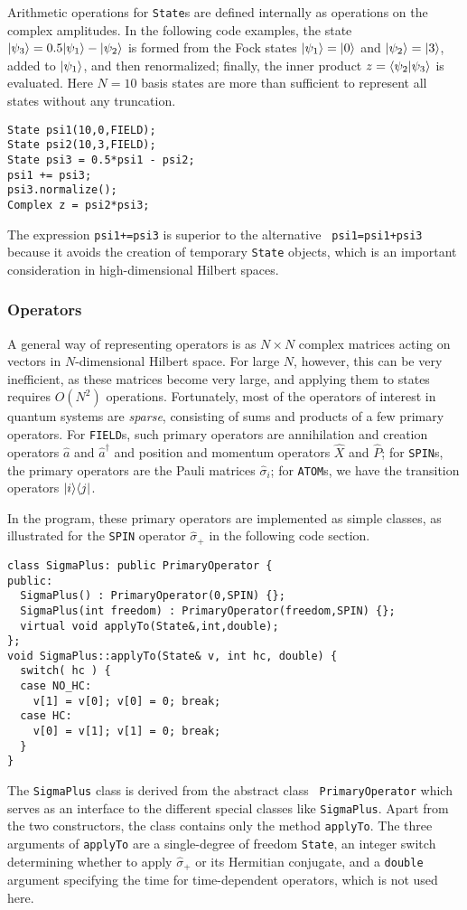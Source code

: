 Arithmetic operations for {\tt State}s are defined internally as operations
on the complex amplitudes. In the following code examples, the state
$| \psi_3 \rangle=0.5| \psi_1 \rangle-| \psi_2 \rangle$ is formed from the Fock states
$| \psi_1 \rangle=| 0 \rangle$ and $| \psi_2 \rangle=| 3 \rangle$, added to $| \psi_1 \rangle$, and
then renormalized; finally, the inner product $z=\langle\psi_2| \psi_3 \rangle$ is
evaluated. Here $N=10$ basis states are more than sufficient to represent all
states without any truncation.
\begin{verbatim}
State psi1(10,0,FIELD);
State psi2(10,3,FIELD);
State psi3 = 0.5*psi1 - psi2;
psi1 += psi3;
psi3.normalize();
Complex z = psi2*psi3;
\end{verbatim}
The expression {\tt psi1+=psi3} is superior to the alternative {\tt
psi1=psi1+psi3} because it avoids the creation of temporary {\tt State}
objects, which is an important consideration in high-dimensional Hilbert
spaces.

\subsubsection{Operators}   \label{secop}

A general way of representing operators is as $N\times N$ complex matrices
acting on vectors in $N$-dimensional Hilbert space. For large $N$, however,
this can be very inefficient, as these matrices become very large, and applying
them to states requires $O(N^2)$ operations. Fortunately, most of the operators
of interest in quantum systems are {\it sparse}, consisting of sums and
products of a few primary operators. For {\tt FIELD}s, such primary operators
are annihilation and creation operators $\hat a$ and $\hat a^\dagger$ and
position and momentum operators $\hat X$ and $\hat P$; for {\tt SPIN}s, the
primary operators are the Pauli matrices $\hat\sigma_i$; for {\tt ATOM}s, we
have the transition operators $| i \rangle\langle j|$.

In the program, these primary operators are implemented as simple classes, as
illustrated for the {\tt SPIN} operator $\hat\sigma_+$ in the following code
section.
\begin{verbatim}
class SigmaPlus: public PrimaryOperator {
public:
  SigmaPlus() : PrimaryOperator(0,SPIN) {};
  SigmaPlus(int freedom) : PrimaryOperator(freedom,SPIN) {};
  virtual void applyTo(State&,int,double);
};
void SigmaPlus::applyTo(State& v, int hc, double) {
  switch( hc ) {
  case NO_HC:
    v[1] = v[0]; v[0] = 0; break;
  case HC:
    v[0] = v[1]; v[1] = 0; break; 
  }
}
\end{verbatim}
The {\tt SigmaPlus} class is derived from the abstract class {\tt
PrimaryOperator} which serves as an interface to the different special classes
like {\tt SigmaPlus}. Apart from the two constructors, the class contains only
the method {\tt applyTo}. The three arguments of {\tt applyTo} are a
single-degree of freedom {\tt State}, an integer switch determining whether to
apply $\hat\sigma_+$ or its Hermitian conjugate, and a {\tt double} argument
specifying the time for time-dependent operators, which is not used here.

